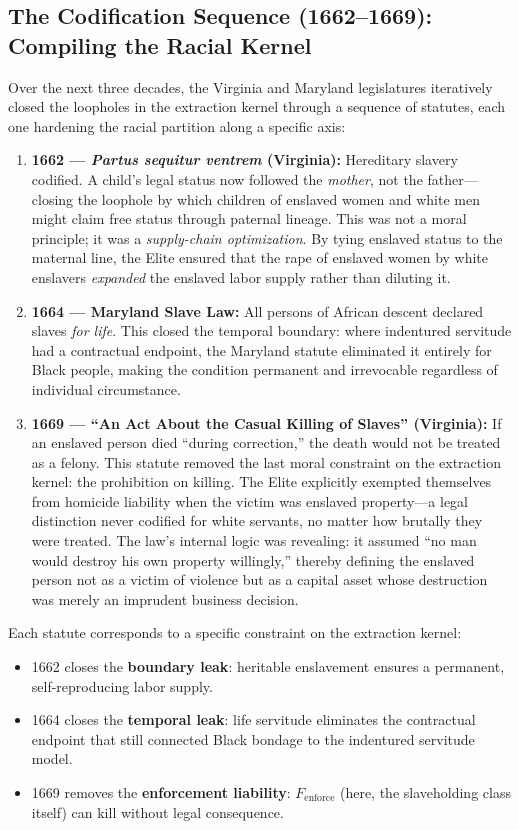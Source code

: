 \documentclass[12pt,openany]{book}
\begin{document}
\subsection{The Codification Sequence (1662--1669): Compiling the Racial Kernel}

Over the next three decades, the Virginia and Maryland legislatures iteratively closed the loopholes in the extraction kernel through a sequence of statutes, each one hardening the racial partition along a specific axis:

\begin{enumerate}
    \item \textbf{1662 --- \textit{Partus sequitur ventrem} (Virginia):} Hereditary slavery codified. A child's legal status now followed the \textit{mother}, not the father---closing the loophole by which children of enslaved women and white men might claim free status through paternal lineage. This was not a moral principle; it was a \textit{supply-chain optimization}. By tying enslaved status to the maternal line, the Elite ensured that the rape of enslaved women by white enslavers \textit{expanded} the enslaved labor supply rather than diluting it.

    \item \textbf{1664 --- Maryland Slave Law:} All persons of African descent declared slaves \textit{for life}. This closed the temporal boundary: where indentured servitude had a contractual endpoint, the Maryland statute eliminated it entirely for Black people, making the condition permanent and irrevocable regardless of individual circumstance.

    \item \textbf{1669 --- ``An Act About the Casual Killing of Slaves'' (Virginia):} If an enslaved person died ``during correction,'' the death would not be treated as a felony. This statute removed the last moral constraint on the extraction kernel: the prohibition on killing. The Elite explicitly exempted themselves from homicide liability when the victim was enslaved property---a legal distinction never codified for white servants, no matter how brutally they were treated. The law's internal logic was revealing: it assumed ``no man would destroy his own property willingly,'' thereby defining the enslaved person not as a victim of violence but as a capital asset whose destruction was merely an imprudent business decision.
\end{enumerate}

Each statute corresponds to a specific constraint on the extraction kernel:
\begin{itemize}
    \item 1662 closes the \textbf{boundary leak}: heritable enslavement ensures a permanent, self-reproducing labor supply.
    \item 1664 closes the \textbf{temporal leak}: life servitude eliminates the contractual endpoint that still connected Black bondage to the indentured servitude model.
    \item 1669 removes the \textbf{enforcement liability}: $F_{\text{enforce}}$ (here, the slaveholding class itself) can kill without legal consequence.
\end{itemize}
\end{document}
